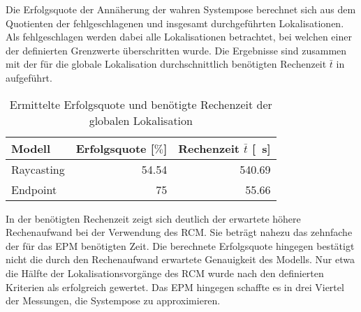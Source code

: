 


Die Erfolgsquote der Annäherung der wahren Systempose berechnet sich aus dem Quotienten der fehlgeschlagenen und insgesamt durchgeführten Lokalisationen. Als fehlgeschlagen werden dabei alle Lokalisationen betrachtet, bei welchen einer der definierten Grenzwerte überschritten wurde. Die Ergebnisse sind zusammen mit der für die globale Lokalisation durchschnittlich benötigten Rechenzeit $\bar{t}$ in  aufgeführt.\\

\begin{table}[ht]
\begin{center}
\setlength{\tabcolsep}{18pt}
	\begin{tabular}[ht]{lrr}
	\toprule
		Modell			& Erfolgsquote [$\%$]	&	Rechenzeit $\bar{t}$	 [\SI{}{\second}]	\\
		\midrule 
		Raycasting		& \SI{54,54}{}					&	\SI{540,69}{}			\\ \addlinespace
		Endpoint			& \SI{75}{}						&	\SI{55,66}{}			\\ 
		\bottomrule
	\end{tabular} 
\caption{Ermittelte Erfolgsquote und benötigte Rechenzeit der globalen Lokalisation}
\label{tab.approx_time}
\end{center}
\end{table}%

In der benötigten Rechenzeit zeigt sich deutlich der erwartete höhere Rechenaufwand bei der Verwendung des RCM. Sie beträgt nahezu das zehnfache der für das EPM benötigten Zeit. Die berechnete Erfolgsquote hingegen bestätigt nicht die durch den Rechenaufwand erwartete Genauigkeit des Modells. Nur etwa die Hälfte der Lokalisationsvorgänge des RCM wurde nach den definierten Kriterien als erfolgreich gewertet. Das EPM hingegen schaffte es in drei Viertel der Messungen, die Systempose zu approximieren.\\

